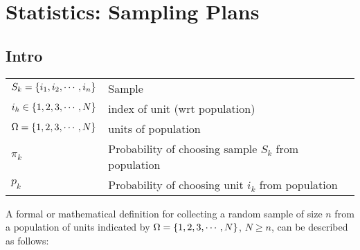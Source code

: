 \chapter{Statistics: Sampling Plans \cite{ism-1}}

\section*{Intro \cite{ism-1}}

\begin{customTableWrapper}{1.3}
\begin{longtable}{l l}
    $S_k = \left\{i_1,i_2,\cdots,i_n\right\}$ & Sample \\

    $i_h \in \left\{1, 2, 3,\cdots, N\right\}$ & index of unit (wrt population) \\

    $\Omega = \left\{1, 2, 3, \cdots, N\right\}$ & units of population \\

    $\pi_k$ & Probability of choosing sample $S_k$ from population\\

    $p_k$ & Probability of choosing unit $i_k$ from population\\
\end{longtable}
\end{customTableWrapper}

A formal or mathematical definition for collecting a random sample of size $n$ from a population of units indicated by $\Omega = \left\{1, 2, 3, \cdots, N\right\}$, $N \geq n$, can be described as follows:

